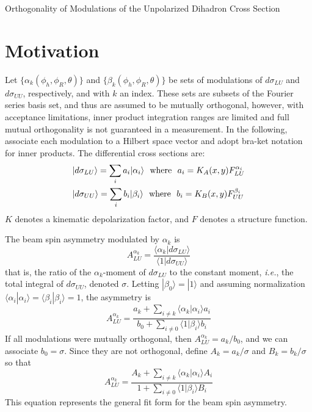 \documentclass[12pt]{article}
\begin{document}
\begin{center}
{\LARGE 
Orthogonality of Modulations of the Unpolarized Dihadron Cross Section
}
\end{center}


\section*{Motivation}

Let $\{\alpha_k(\phi_h,\phi_R,\theta)\}$ and $\{\beta_k(\phi_h,\phi_R,\theta)\}$
be sets of modulations of $d\sigma_{LU}$ and $d\sigma_{UU}$, respectively, and
with $k$ an index. These sets are subsets of the Fourier series basis set, and
thus are assumed to be mutually orthogonal, however, with acceptance
limitations, inner product integration ranges are limited and full mutual
orthogonality is not guaranteed in a measurement. In the following, associate
each modulation to a Hilbert space vector and adopt bra-ket notation for inner
products. The differential cross sections are:
\begin{align}
\displaystyle
&|d\sigma_{LU}\rangle=\sum_{i}{a_i|\alpha_i\rangle}~ ~\text{where}~ ~
a_i=K_A(x,y)F_{LU}^{\alpha_i}\\
&|d\sigma_{UU}\rangle=\sum_{i}{b_i|\beta_i\rangle}~ ~\text{where}~ ~
b_i=K_B(x,y)F_{UU}^{\beta_i}
\end{align}
$K$ denotes a kinematic depolarization factor, and $F$ denotes a structure function.

The beam spin asymmetry modulated by $\alpha_k$ is
\begin{equation}
\displaystyle
A_{LU}^{\alpha_k}=\frac{\langle\alpha_k|d\sigma_{LU}\rangle}
                  {\langle1|d\sigma_{UU}\rangle}
\end{equation}
that is, the ratio of the $\alpha_k$-moment of $d\sigma_{LU}$ to the
constant moment, {\it i.e.}, the total integral of $d\sigma_{UU}$, denoted
$\sigma$. Letting $|\beta_0\rangle=|1\rangle$ and assuming normalization
$\langle\alpha_i|\alpha_i\rangle=\langle\beta_i|\beta_i\rangle=1$, the asymmetry is 
\begin{equation}
A_{LU}^{\alpha_k}=\dfrac
{ a_k+\sum_{i\neq k}{\langle \alpha_k|\alpha_i\rangle a_i} }
{ b_0+\sum_{i\neq 0}{\langle 1|\beta_i\rangle b_i} }
\end{equation}
If all modulations were mutually orthogonal, then $A_{LU}^{\alpha_k}=a_k/b_0$,
and we can associate $b_0=\sigma$. Since they are not orthogonal, define
$A_k=a_k/\sigma$ and $B_k=b_k/\sigma$ so that
\begin{equation}
A_{LU}^{\alpha_k}=\dfrac
{ A_k+\sum_{i\neq k}{\langle \alpha_k|\alpha_i\rangle A_i} }
{ 1+\sum_{i\neq 0}{\langle 1|\beta_i\rangle B_i} }
\end{equation}
This equation represents the general fit form for the beam spin asymmetry.
\end{document}
